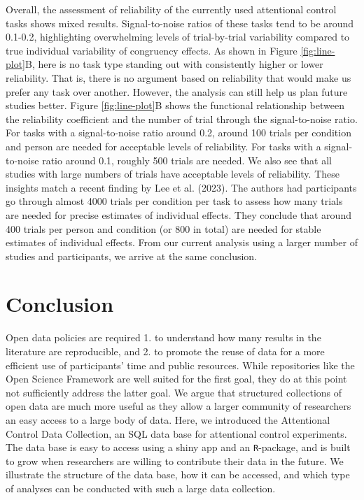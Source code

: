 \documentclass[
  man,floatsintext]{apa6}
\begin{document}
Overall, the assessment of reliability of the currently used attentional control tasks shows mixed results. Signal-to-noise ratios of these tasks tend to be around 0.1-0.2, highlighting overwhelming levels of trial-by-trial variability compared to true individual variability of congruency effects. As shown in Figure \ref{fig:line-plot}B, here is no task type standing out with consistently higher or lower reliability. That is, there is no argument based on reliability that would make us prefer any task over another. However, the analysis can still help us plan future studies better. Figure \ref{fig:line-plot}B shows the functional relationship between the reliability coefficient and the number of trial through the signal-to-noise ratio. For tasks with a signal-to-noise ratio around 0.2, around 100 trials per condition and person are needed for acceptable levels of reliability. For tasks with a signal-to-noise ratio around 0.1, roughly 500 trials are needed. We also see that all studies with large numbers of trials have acceptable levels of reliability. These insights match a recent finding by Lee et al. (2023). The authors had participants go through almost 4000 trials per condition per task to assess how many trials are needed for precise estimates of individual effects. They conclude that around 400 trials per person and condition (or 800 in total) are needed for stable estimates of individual effects. From our current analysis using a larger number of studies and participants, we arrive at the same conclusion.

\hypertarget{conclusion}{%
\section{Conclusion}\label{conclusion}}

Open data policies are required 1. to understand how many results in the literature are reproducible, and 2. to promote the reuse of data for a more efficient use of participants' time and public resources. While repositories like the Open Science Framework are well suited for the first goal, they do at this point not sufficiently address the latter goal. We argue that structured collections of open data are much more useful as they allow a larger community of researchers an easy access to a large body of data. Here, we introduced the Attentional Control Data Collection, an SQL data base for attentional control experiments. The data base is easy to access using a shiny app and an \texttt{R}-package, and is built to grow when researchers are willing to contribute their data in the future. We illustrate the structure of the data base, how it can be accessed, and which type of analyses can be conducted with such a large data collection.
\end{document}
